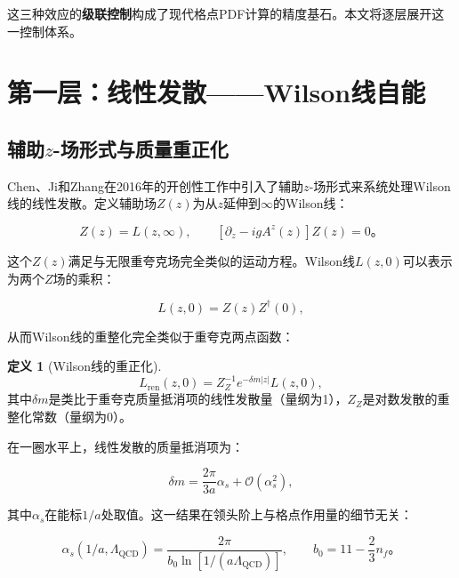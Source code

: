 \documentclass[12pt,a4paper]{ctexart}
\theoremstyle{definition}
\newtheorem{definition}{定义}[section]
\begin{document}
这三种效应的\textbf{级联控制}构成了现代格点PDF计算的精度基石。本文将逐层展开这一控制体系。

\section{第一层：线性发散——Wilson线自能}

\subsection{辅助$z$-场形式与质量重正化}

Chen、Ji和Zhang在2016年的开创性工作中\cite{Chen2016improved}引入了辅助$z$-场形式来系统处理Wilson线的线性发散。定义辅助场$Z(z)$为从$z$延伸到$\infty$的Wilson线：

\begin{equation}
Z(z) = L(z, \infty), \qquad [\partial_z - igA^z(z)] Z(z) = 0。
\label{eq:Z_field}
\end{equation}

这个$Z(z)$满足与无限重夸克场完全类似的运动方程。Wilson线$L(z,0)$可以表示为两个$Z$场的乘积：

\begin{equation}
L(z, 0) = Z(z) Z^\dagger(0),
\label{eq:Wilson_as_ZZ}
\end{equation}

从而Wilson线的重整化完全类似于重夸克两点函数\cite{Chen2016improved,Huo2021self}：

\begin{definition}[Wilson线的重正化]\cite{Chen2016improved}
\begin{equation}
\boxed{L_{\text{ren}}(z, 0) = Z^{-1}_Z e^{-\delta m |z|} L(z, 0)},
\label{eq:Wilson_renorm}
\end{equation}
其中$\delta m$是类比于重夸克质量抵消项的线性发散量（量纲为1），$Z_Z$是对数发散的重整化常数（量纲为0）。
\end{definition}

在一圈水平上，线性发散的质量抵消项为\cite{Chen2016improved,Huo2021self}：

\begin{equation}
\delta m = \frac{2\pi}{3a} \alpha_s + \mathcal{O}(\alpha_s^2),
\label{eq:delta_m_one_loop}
\end{equation}

其中$\alpha_s$在能标$1/a$处取值。这一结果在领头阶上与格点作用量的细节无关\cite{Huo2021self}：

\begin{equation}
\alpha_s(1/a, \Lambda_{\text{QCD}}) = \frac{2\pi}{b_0 \ln[1/(a\Lambda_{\text{QCD}})]}, \qquad b_0 = 11 - \frac{2}{3}n_f。
\label{eq:alpha_s_lattice}
\end{equation}
\end{document}
